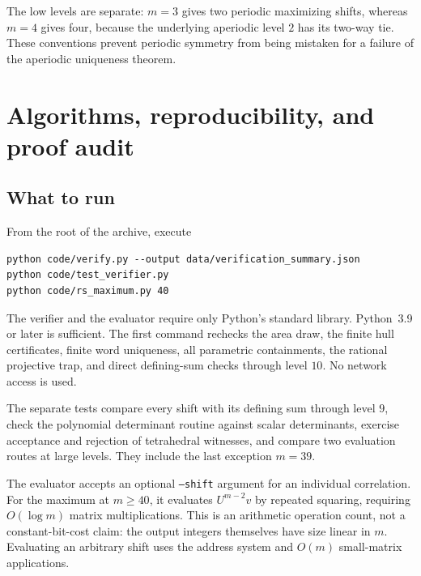 \documentclass[11pt,a4paper]{article}
\theoremstyle{definition}\newtheorem{definition}[theorem]{Definition}
\theoremstyle{remark}\newtheorem{remark}[theorem]{Remark}
\begin{document}
The low levels are separate: $m=3$ gives two periodic maximizing shifts,
whereas $m=4$ gives four, because the underlying aperiodic level $2$ has its
two-way tie. These conventions prevent periodic symmetry from being
mistaken for a failure of the aperiodic uniqueness theorem.

\section{Algorithms, reproducibility, and proof audit}
\label{sec:reproduce}

\subsection{What to run}
From the root of the archive, execute
\begin{lstlisting}
python code/verify.py --output data/verification_summary.json
python code/test_verifier.py
python code/rs_maximum.py 40
\end{lstlisting}
The verifier and the evaluator require only Python's standard library.
Python~3.9 or later is sufficient. The first command rechecks the area draw,
the finite hull certificates, finite word uniqueness, all parametric
containments, the rational projective trap, and direct defining-sum checks
through level $10$. No network access is used.

The separate tests compare every shift with its defining sum through level
$9$, check the polynomial determinant routine against scalar determinants,
exercise acceptance and rejection of tetrahedral witnesses, and compare two
evaluation routes at large levels. They include the last exception $m=39$.

The evaluator accepts an optional \texttt{--shift} argument for an individual
correlation. For the maximum at $m\ge40$, it evaluates $U^{m-2}v$ by repeated
squaring, requiring $O(\log m)$ matrix multiplications. This is an arithmetic
operation count, not a constant-bit-cost claim: the output integers themselves
have size linear in $m$. Evaluating an arbitrary shift uses the address
system and $O(m)$ small-matrix applications.
\end{document}
